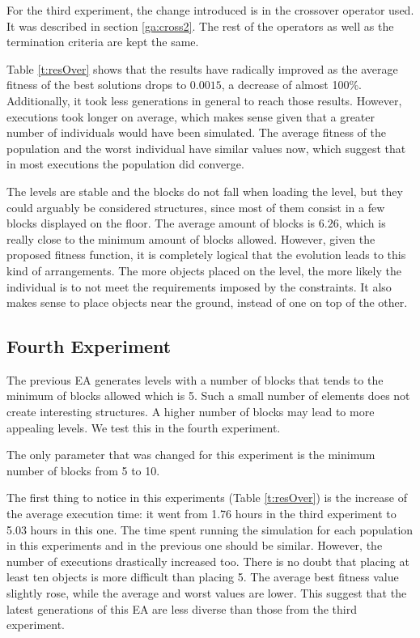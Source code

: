 \documentclass[runningheads,a4paper]{llncs}
\begin{document}
For the third experiment, the change introduced is in the crossover operator 
used. It was described in section \ref{ga:cross2}. The rest of the operators as 
well as the termination criteria are kept the same. 


Table \ref{t:resOver} shows that the results have radically improved as the 
average fitness of the best solutions drops to $0.0015$, a decrease of almost 
100\%. Additionally, it took less generations in general to reach those 
results. However, executions took longer on average, which makes sense given 
that a greater number of individuals would have been simulated. The average 
fitness of the population and the worst individual have similar values now, 
which suggest that in most executions the population did converge.

The levels are stable and the blocks do not fall when loading the level, but 
they could arguably be considered structures, since most of them consist in a 
few blocks displayed on the floor. The average amount of blocks is $6.26$, 
which is really close to the minimum amount of blocks allowed. However, given 
the proposed fitness function, it is completely logical that the evolution 
leads to this kind of arrangements. The more objects placed on the level, the 
more likely the individual is to not meet the requirements imposed by the 
constraints. It also makes sense to place objects near the ground, instead of 
one on top of the other.

\subsection{Fourth Experiment}
The previous EA generates levels with a number of blocks that tends to the 
minimum of blocks allowed which is 5. Such a small number of elements does not 
create interesting structures. A higher number of blocks may lead to more 
appealing levels. We test this in the fourth experiment.


The only parameter that was changed for this experiment is the minimum number 
of blocks from 5 to 10. 


The first thing to notice in this experiments (Table \ref{t:resOver}) is the 
increase of the average execution time: it went from 1.76 hours in the third 
experiment to 5.03 hours in this one. The time spent running the simulation for 
each population in this experiments and in the previous one should be similar. 
However, the number of executions drastically increased too. There is no doubt 
that placing at least ten objects is more difficult than placing 5. The average 
best fitness value slightly rose, while the average and worst values are lower. 
This suggest that the latest generations of this EA are less diverse than those 
from the third experiment.
\end{document}
